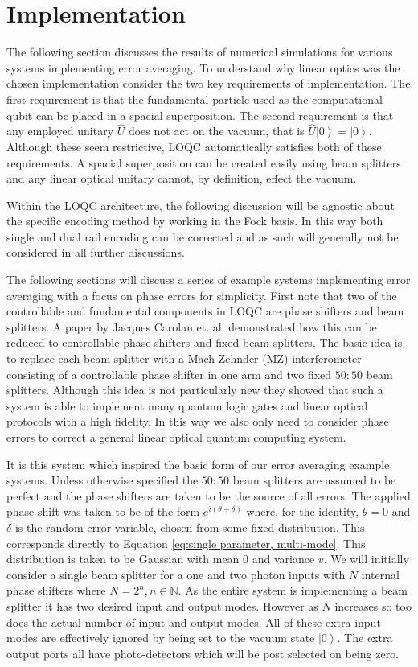 \documentclass[aps,pra,twocolumn,superscriptaddress,numerical]{revtex4-1}
\begin{document}
\section{Implementation \label{implementation}}
		
	The following section discusses the results of numerical simulations for various systems implementing error averaging. To understand why linear optics was the chosen implementation consider the two key requirements of implementation. The first requirement is that the fundamental particle used as the computational qubit can be placed in a spacial superposition. The second requirement is that any employed unitary $\hat{U}$  does not act on the vacuum, that is $\hat{U}\left|0\right>=\left|0\right>$. Although these seem restrictive, LOQC automatically satisfies both of these requirements. A spacial superposition can be created easily using beam splitters and any linear optical unitary cannot, by definition, effect the vacuum.
	
	Within the LOQC architecture, the following discussion will be agnostic about the specific encoding method by working in the Fock basis. In this way both single and dual rail encoding can be corrected and as such will generally not be considered in all further discussions.
	
	The following sections will discuss a series of example systems implementing error averaging with a focus on phase errors for simplicity. First note that two of the controllable and fundamental components in LOQC are phase shifters and beam splitters. A paper by Jacques Carolan et. al. \cite{ULO} demonstrated how this can be reduced to controllable phase shifters and fixed beam splitters. The basic idea is to replace each beam splitter with a Mach Zehnder (MZ) interferometer consisting of a controllable phase shifter in one arm and two fixed $50:50$ beam splitters. Although this idea is not particularly new they showed that such a system is able to implement many quantum logic gates and linear optical protocols with a high fidelity.  In this way we also only need to consider phase errors to correct a general linear optical quantum computing system.
	
	It is this system which inspired the basic form of our error averaging example systems. Unless otherwise specified the $50:50$ beam splitters are assumed to be perfect and the phase shifters are taken to be the source of all errors. The applied phase shift was taken to be of the form $e^{i(\theta+\delta)}$ where, for the identity, $\theta=0$ and $\delta$ is the random error variable, chosen from some fixed distribution. This corresponds directly to Equation \ref{eq:single parameter, multi-mode}. This distribution is taken to be Gaussian with mean $0$ and variance $v$. We will initially consider a single beam splitter for a one and two photon inputs with $N$ internal phase shifters where $N=2^{n},n\in\mathbb{N}$. As the entire system is implementing a beam splitter it has two desired input and output modes. However as $N$ increases so too does the actual number of input and output modes. All of these extra input modes are effectively ignored by being set to the vacuum state $\left|0\right\rangle $. The extra output ports all have photo-detectors which will be post selected on being zero.
		
\end{document}
